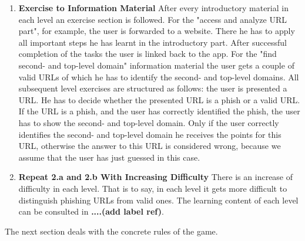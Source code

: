 \begin{enumerate}
\begin{enumerate}
		\item \textbf{Exercise to Information Material} After every introductory material in each level an exercise section is followed. For the "access and analyze URL part", for example, the user is forwarded to a website. There he has to apply all important steps he has learnt in the introductory part. After successful completion of the tasks the user is linked back to the app. For the "find second- and top-level domain" information material the user gets a couple of valid URLs of which he has to identify the second- and top-level domains. All subsequent level exercises are structured as follows: the user is presented a URL. He has to decide whether the presented URL is a phish or a valid URL. If the URL is a phish, and the user has correctly identified the phish, the user has to show the second- and top-level domain. Only if the user correctly identifies the second- and top-level domain he receives the points for this URL, otherwise the answer to this URL is considered wrong, because we assume that the user has just guessed in this case.
		\item \textbf{Repeat 2.a and 2.b With Increasing Difficulty} There is an increase of difficulty in each level. That is to say, in each level it gets more difficult to distinguish phishing URLs from valid ones. The learning content of each level can be consulted in \textbf{....(add label ref)}.
	\end{enumerate}
\end{enumerate}

The next section deals with the concrete rules of the game.
